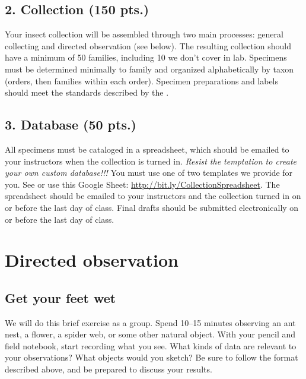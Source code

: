 \documentclass[letterpaper, 11pt]{article}
\begin{document}
\subsection*{2. Collection (150 pts.)}
Your insect collection will be assembled through two main processes: general collecting and directed observation (see below). The resulting collection should have a minimum of 50 families, including 10 we don't cover in lab. Specimens must be determined minimally to family and organized alphabetically by taxon (orders, then families within each order). Specimen preparations and labels should meet the standards described by the \cite{FrostSOP03}.

\subsection*{3. Database (50 pts.)}
All specimens must be cataloged in a spreadsheet, which should be emailed to your instructors when the collection is turned in. \textit{Resist the temptation to create your own custom database!!!} You must use one of two templates we provide for you. See \cite{GBIFspreadsheet} or use this Google Sheet: \url{http://bit.ly/CollectionSpreadsheet}. The spreadsheet should be emailed to your instructors and the collection turned in on or before the last day of class. Final drafts should be submitted electronically on or before the last day of class.

\section*{Directed observation}

\subsection*{Get your feet wet}
We will do this brief exercise as a group. Spend 10--15 minutes observing an ant nest, a flower, a spider web, or some other natural object. With your pencil and field notebook, start recording what you see. What kinds of data are relevant to your observations? What objects would you sketch? Be sure to follow the format described above, and be prepared to discuss your results.
\end{document}
